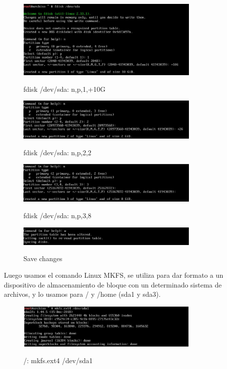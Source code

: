 \documentclass[11pt,letterpaper]{article}
\begin{document}
  \begin{figure}[H]
        \centering
        \includegraphics[width=0.8\textwidth]{img/3.png}
        \label{img:Imagen 3}
        \caption{fdisk /dev/sda: n,p,1,+10G}
\end{figure}
\begin{figure}[H]
        \centering
        \includegraphics[width=0.8\textwidth]{img/4.png}
        \label{img:Imagen 4}
        \caption{fdisk /dev/sda: n,p,2,2}
\end{figure}
 \begin{figure}[H]
        \centering
        \includegraphics[width=0.8\textwidth]{img/5.png}
        \label{img:Imagen 4}
        \caption{fdisk /dev/sda: n,p,3,8}
\end{figure}
\begin{figure}[H]
        \centering
        \includegraphics[width=0.8\textwidth]{img/6.png}
        \label{img:Imagen 4}
        \caption{Save changes}
\end{figure}
  Luego usamos el comando Linux MKFS, se  utiliza para dar formato a un dispositivo de almacenamiento de bloque con un determinado sistema de archivos, y lo usamos para / y /home (sda1 y sda3).
\begin{figure}[H]
        \centering
        \includegraphics[width=0.8\textwidth]{img/7.png}
        \label{img:Imagen 4}
        \caption{/: mkfs.ext4 /dev/sda1}
\end{figure}
\end{document}
